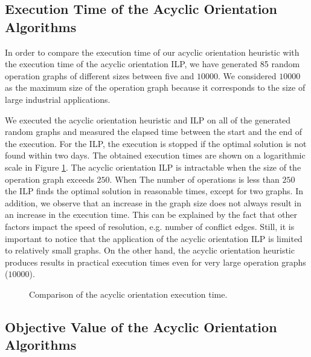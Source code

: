 \subsection{Execution Time of the Acyclic Orientation Algorithms}

In order to compare the execution time of our acyclic orientation heuristic with the execution time of the acyclic orientation ILP, we have generated 85 random operation graphs of different sizes between five and $10000$. %
We considered $10000$ as the maximum size of the operation graph because it corresponds to the size of large industrial applications. 

We executed the acyclic orientation heuristic and ILP on all of the generated random graphs and measured the elapsed time between the start and the end of the execution. For the ILP, the execution is stopped if the optimal solution is not found within two days. The obtained execution times are shown on a logarithmic scale in Figure \ref{fig:orient_exec}. The acyclic orientation ILP is intractable when the size of the operation graph exceeds $250$. When The number of operations is less than $250$ the ILP finds the optimal solution in reasonable times, except for two graphs. In addition, we observe that an increase in the graph size does not always result in an increase in the execution time. This can be explained by the fact that other factors impact the speed of resolution, e.g. number of conflict edges. Still, it is important to notice that the application of the acyclic orientation ILP is limited to relatively small graphs. On the other hand, the acyclic orientation heuristic produces results in practical execution times even for very large operation graphs ($10000$).

\begin{figure}[phbt]
\centering

\caption{Comparison of the acyclic orientation execution time.}
\label{fig:orient_exec}
\end{figure} 
 
\subsection{Objective Value of the Acyclic Orientation Algorithms}

